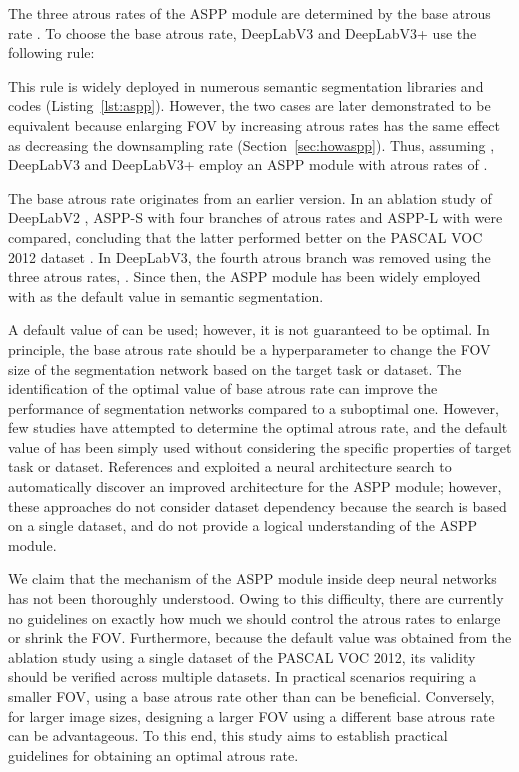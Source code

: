 \documentclass{article}
\def\secref#1{Section~\ref{#1}}
\def\lstref#1{Listing~\ref{#1}}
\begin{document}
The three atrous rates  of the ASPP module are determined by the base atrous rate . To choose the base atrous rate, DeepLabV3 \citep{DBLP:journals/corr/ChenPSA17} and DeepLabV3+ \citep{DBLP:conf/eccv/ChenZPSA18} use the following rule:

This rule is widely deployed in numerous semantic segmentation libraries and codes (\lstref{lst:aspp}). However, the two cases are later demonstrated to be equivalent because enlarging FOV by increasing atrous rates has the same effect as decreasing the downsampling rate (\secref{sec:howaspp}). Thus, assuming , DeepLabV3 and DeepLabV3+ employ an ASPP module with atrous rates of .


The base atrous rate  originates from an earlier version. In an ablation study of DeepLabV2 \citep{DBLP:journals/pami/ChenPKMY18}, ASPP-S with four branches of atrous rates  and ASPP-L with  were compared, concluding that the latter performed better on the PASCAL VOC 2012 dataset \citep{DBLP:journals/ijcv/EveringhamEGWWZ15}. In DeepLabV3, the fourth atrous branch was removed using the three atrous rates, . Since then, the ASPP module has been widely employed with  as the default value in semantic segmentation.

A default value of  can be used; however, it is not guaranteed to be optimal. In principle, the base atrous rate  should be a hyperparameter to change the FOV size of the segmentation network based on the target task or dataset. The identification of the optimal value of base atrous rate can improve the performance of segmentation networks compared to a suboptimal one. However, few studies have attempted to determine the optimal atrous rate, and the default value of  has been simply used without considering the specific properties of target task or dataset. References \citep{DBLP:conf/nips/ChenCZPZSAS18} and \citep{DBLP:conf/cvpr/LiuCSAHY019} exploited a neural architecture search to automatically discover an improved architecture for the ASPP module; however, these approaches do not consider dataset dependency because the search is based on a single dataset, and do not provide a logical understanding of the ASPP module.

We claim that the mechanism of the ASPP module inside deep neural networks has not been thoroughly understood. Owing to this difficulty, there are currently no guidelines on exactly how much we should control the atrous rates to enlarge or shrink the FOV. Furthermore, because the default value  was obtained from the ablation study using a single dataset of the PASCAL VOC 2012, its validity should be verified across multiple datasets. In practical scenarios requiring a smaller FOV, using a base atrous rate other than  can be beneficial. Conversely, for larger image sizes, designing a larger FOV using a different base atrous rate can be advantageous. To this end, this study aims to establish practical guidelines for obtaining an optimal atrous rate.
\end{document}

